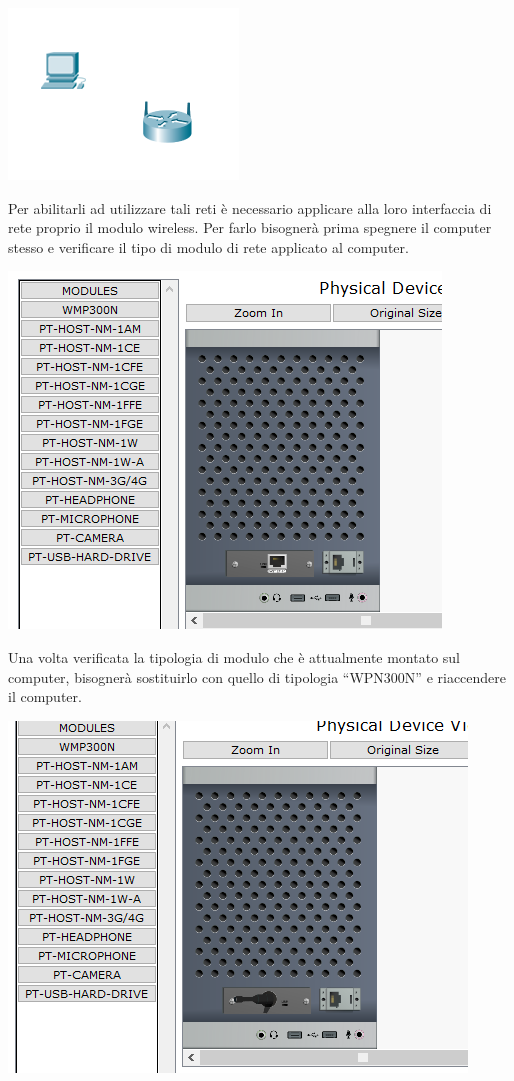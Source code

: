 \begin{center}
    \includegraphics[width=0.4\linewidth]{images/08.wireless/03.png}
\end{center}

Per abilitarli ad utilizzare tali reti è necessario applicare alla loro interfaccia di rete proprio il modulo wireless. Per farlo bisognerà prima spegnere il computer stesso e verificare il tipo di modulo di rete applicato al computer.

\begin{center}
    \includegraphics[width=0.5\linewidth]{images/08.wireless/04.png}
\end{center}

Una volta verificata la tipologia di modulo che è attualmente montato sul computer, bisognerà sostituirlo con quello di tipologia “WPN300N” e riaccendere il computer.

\begin{center}
    \includegraphics[width=0.5\linewidth]{images/08.wireless/05.png}
\end{center}

